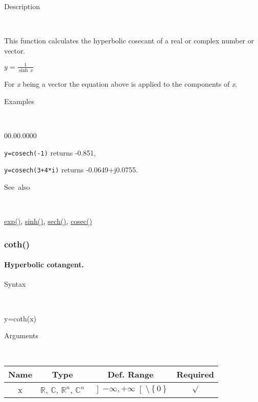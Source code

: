 \begin{description}
\item [Description]~
\end{description}
This function calculates the hyperbolic cosecant of a real or complex
number or vector.

\medskip{}
$y={\displaystyle \frac{1}{\sinh\, x}}$ 
\medskip{}

\noindent For \textit{x} being a vector the equation above is applied
to the components of \textit{x}.

\begin{description}
\item [Examples]~
\end{description}
\begin{lyxlist}{00.00.0000}
\item [\texttt{y=cosech(-1)}]returns -0.851,
\item [\texttt{y=cosech(3+4{*}i)}]returns -0.0649+j0.0755.
\end{lyxlist}
\begin{description}
\item [See~also]~
\end{description}
\textcolor{blue}{\hyperlink{exp}{exp()}}\textcolor{black}{,} \textcolor{blue}{\hyperlink{sinh}{sinh()}}\textcolor{black}{,}
\textcolor{blue}{\hyperlink{sech}{sech()}}\textcolor{black}{,} \textcolor{blue}{\hyperlink{cosec}{cosec()}}


\newpage
\subsubsection*{\hypertarget{coth}{}{\Large coth()}}


\paragraph{\label{par:Hyperbolic-cotangent}Hyperbolic cotangent.}

\begin{description}
\item [Syntax]~
\end{description}
y=coth(x)

\begin{description}
\item [Arguments]~
\end{description}
\begin{tabular}{|c|c|c|c|}
\hline 
Name&
Type&
Def. Range&
Required\tabularnewline
\hline
\hline 
x&
$\mathbb{R}$, $\mathbb{C}$, $\mathbb{R}^{n}$, $\mathbb{C}^{n}$&
$\left]-\infty,+\infty\right[$$\setminus\left\{ 0\right\} $&
$\surd$\tabularnewline
\hline
\end{tabular}

